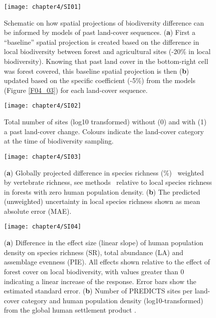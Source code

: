\begin{figure}[htb]
\centering
\texttt{[image: chapter4/SI01]}
\caption{ Schematic on how spatial projections of biodiversity difference can be informed by models of past land-cover sequences. (\textbf{a}) First a “baseline” spatial projection is created based on the difference in local biodiversity between forest and agricultural sites (-20\% in local biodiversity). Knowing that past land cover in the bottom-right cell was forest covered, this baseline spatial projection is then (\textbf{b}) updated based on the specific coefficient (-5\%) from the models (Figure \ref{F04_03}) for each land-cover sequence. }
\label{SI04_01}
\end{figure}

\begin{figure}[htb]
\centering
\texttt{[image: chapter4/SI02]}
\caption{ Total number of sites (log10 transformed) without (0) and with (1) a past land-cover change. Colours indicate the land-cover category at the time of biodiversity sampling. }
\label{SI04_02}
\end{figure}

\begin{figure}[htb]
\centering
\texttt{[image: chapter4/SI03]}
\caption{ (\textbf{a}) Globally projected difference in species richness (\%) \textendash\ weighted by vertebrate richness, see methods \textendash\ relative to local species richness in forests with zero human population density. (\textbf{b}) The predicted (unweighted) uncertainty in local species richness shown as mean absolute error (MAE). }
\label{SI04_03}
\end{figure}

\begin{figure}[htb]
\centering
\texttt{[image: chapter4/SI04]}
\caption{ (\textbf{a}) Difference in the effect size (linear slope) of human population density on species richness (SR), total abundance (LA) and assemblage evenness (PIE). All effects shown relative to the effect of forest cover on local biodiversity, with values greater than 0 indicating a linear increase of the response. Error bars show the estimated standard error. (\textbf{b}) Number of PREDICTS sites per land-cover category and human population density (log10-transformed) from the global human settlement product \citep{Pesaresi2016}. }
\label{SI04_04}
\end{figure}


